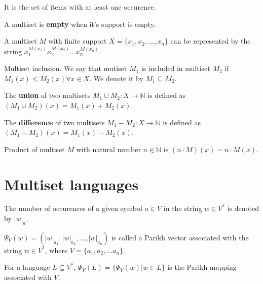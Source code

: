 It is the set of items with at least one occurence.

\begin{definition}
A multiset is {\bf empty} when it's support is empty.
\end{definition}

A multiset $M$ with finite support $X = \{x_1, x_2, \dots, x_n\}$ can be represented by the string $x_1^{M(x_1)}x_2^{M(x_2)}\dots x_n^{M(x_n)}$.

\begin{definition}
Multiset inclusion. We say that mutiset $M_1$ is included in multiset $M_2$ if $M_1(x)\leq M_2(x)\forall x \in X$. We denote it by $M_1\subseteq M_2$.
\end{definition}

\begin{definition}
The {\bf union} of two multisets $M_1\cup M_2 : X\rightarrow \mathbb N$ is defined as $(M_1\cup M_2)(x)=M_1(x)+M_2(x)$.
\end{definition}

\begin{definition}
The {\bf difference} of two multisets $M_1-M_2 : X\rightarrow \mathbb N$ is defined as $(M_1-M_2)(x)=M_1(x)-M_2(x)$.
\end{definition}

\begin{definition}
Product of multiset $M$ with natural number $n\in \mathbb N$ is $(n\cdot M)(x)=n\cdot M(x)$.  
\end{definition}


\section{Multiset languages} %
\label{sec:multiset_languages}

The number of occurences of a given symbol $a\in V$ in the string $w\in V^*$ is denoted by $|w|_a$.

\begin{definition}
$\Psi_V(w)=(|w|_{a_1},|w|_{a_2},\dots,|w|_{a_n})$ is called a Parikh vector associated with the string $w\in V^*$, where $V=\{a_1,a_2,\dots a_n\}$.
\end{definition}

\begin{definition}
For a language $L\subseteq V^*$, $\Psi_V(L)=\{\Psi_V(w)|w\in L\}$ is the Parikh mapping associated with $V$.
\end{definition}

